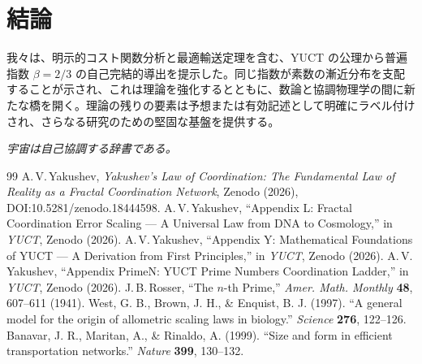 \documentclass[11pt,a4paper]{article}
\begin{document}
	\section{結論}
	我々は、明示的コスト関数分析と最適輸送定理を含む、YUCT の公理から普遍指数 \(\beta = 2/3\) の自己完結的導出を提示した。同じ指数が素数の漸近分布を支配することが示され、これは理論を強化するとともに、数論と協調物理学の間に新たな橋を開く。理論の残りの要素は予想または有効記述として明確にラベル付けされ、さらなる研究のための堅固な基盤を提供する。
	
	\begin{center}
		\textit{宇宙は自己協調する辞書である。}
	\end{center}
	
	\begin{thebibliography}{99}
		A.\,V.\,Yakushev, \emph{Yakushev's Law of Coordination: The Fundamental Law of Reality as a Fractal Coordination Network}, Zenodo (2026), DOI:10.5281/zenodo.18444598.
		A.\,V.\,Yakushev, ``Appendix L: Fractal Coordination Error Scaling — A Universal Law from DNA to Cosmology,'' in \emph{YUCT}, Zenodo (2026).
		A.\,V.\,Yakushev, ``Appendix Y: Mathematical Foundations of YUCT — A Derivation from First Principles,'' in \emph{YUCT}, Zenodo (2026).
		A.\,V.\,Yakushev, ``Appendix PrimeN: YUCT Prime Numbers Coordination Ladder,'' in \emph{YUCT}, Zenodo (2026).
		J.\,B.\,Rosser, ``The \(n\)-th Prime,'' \emph{Amer. Math. Monthly} \textbf{48}, 607--611 (1941).
		West, G. B., Brown, J. H., \& Enquist, B. J. (1997). ``A general model for the origin of allometric scaling laws in biology.'' \emph{Science} \textbf{276}, 122--126.
		Banavar, J. R., Maritan, A., \& Rinaldo, A. (1999). ``Size and form in efficient transportation networks.'' \emph{Nature} \textbf{399}, 130--132.
	\end{thebibliography}
	
\end{document}
